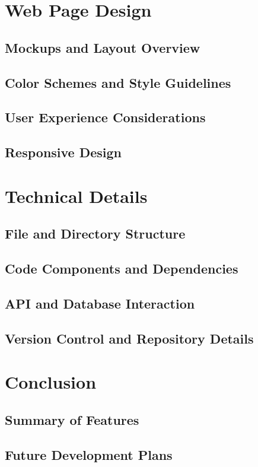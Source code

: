 \documentclass[12pt]{article}
\begin{document}
\newpage
\section{Web Page Design}
\subsection{Mockups and Layout Overview}
\subsection{Color Schemes and Style Guidelines}
\subsection{User Experience Considerations}
\subsection{Responsive Design}

\newpage
\section{Technical Details}
\subsection{File and Directory Structure}
\subsection{Code Components and Dependencies}
\subsection{API and Database Interaction}
\subsection{Version Control and Repository Details}

\newpage
\section{Conclusion}
\subsection{Summary of Features}
\subsection{Future Development Plans}
\end{document}
